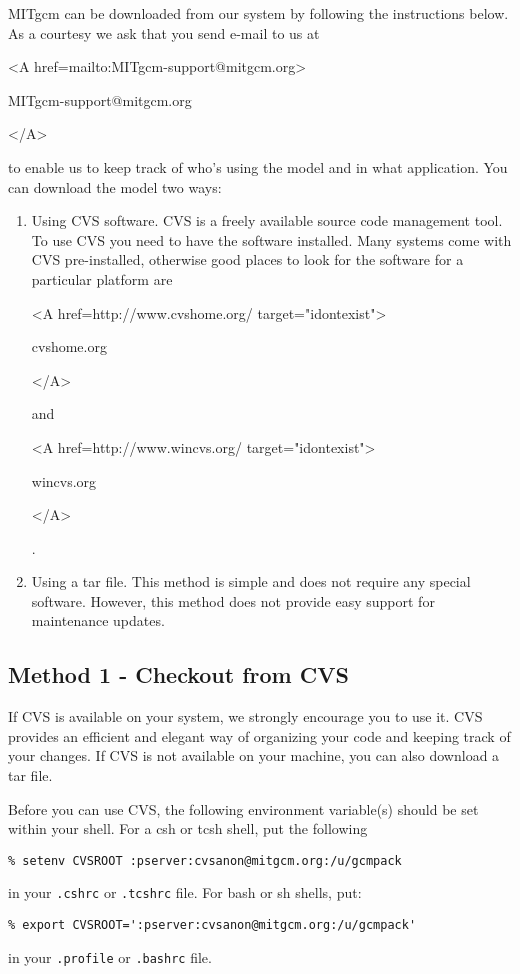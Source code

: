 MITgcm can be downloaded from our system by following
the instructions below. As a courtesy we ask that you send e-mail to us at
\begin{rawhtml} <A href=mailto:MITgcm-support@mitgcm.org> \end{rawhtml}
MITgcm-support@mitgcm.org
\begin{rawhtml} </A> \end{rawhtml}
to enable us to keep track of who's using the model and in what application.
You can download the model two ways:

\begin{enumerate}
\item Using CVS software. CVS is a freely available source code management
tool. To use CVS you need to have the software installed. Many systems
come with CVS pre-installed, otherwise good places to look for
the software for a particular platform are
\begin{rawhtml} <A href=http://www.cvshome.org/ target="idontexist"> \end{rawhtml}
cvshome.org
\begin{rawhtml} </A> \end{rawhtml}
and
\begin{rawhtml} <A href=http://www.wincvs.org/ target="idontexist"> \end{rawhtml}
wincvs.org
\begin{rawhtml} </A> \end{rawhtml}
.

\item Using a tar file. This method is simple and does not
require any special software. However, this method does not
provide easy support for maintenance updates.

\end{enumerate}

\subsection{Method 1 - Checkout from CVS}
\label{sect:cvs_checkout}

If CVS is available on your system, we strongly encourage you to use it. CVS
provides an efficient and elegant way of organizing your code and keeping
track of your changes. If CVS is not available on your machine, you can also
download a tar file.

Before you can use CVS, the following environment variable(s) should
be set within your shell.  For a csh or tcsh shell, put the following 
\begin{verbatim}
% setenv CVSROOT :pserver:cvsanon@mitgcm.org:/u/gcmpack
\end{verbatim}
in your \texttt{.cshrc} or \texttt{.tcshrc} file.  For bash or sh
shells, put:
\begin{verbatim}
% export CVSROOT=':pserver:cvsanon@mitgcm.org:/u/gcmpack'
\end{verbatim}
in your \texttt{.profile} or \texttt{.bashrc} file.


